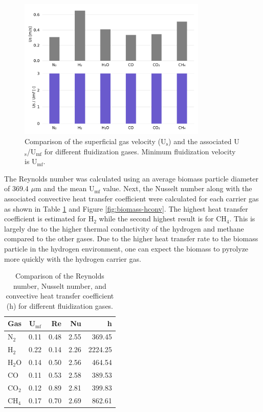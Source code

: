 \begin{figure}[H]
    \centering
    \includegraphics[width=0.8\textwidth]{figures/us-usumf-gases.pdf}
    \caption{Comparison of the superficial gas velocity (U$_\text{s}$) and the associated U$_\text{s}$/U$_\text{mf}$ for different fluidization gases. Minimum fluidization velocity is U$_\text{mf}$.}
    \label{fig:us-usumf-gases}
\end{figure}

The Reynolds number was calculated using an average biomass particle diameter of 369.4 $\mu$m and the mean U$_\text{mf}$ value. Next, the Nusselt number along with the associated convective heat transfer coefficient were calculated for each carrier gas as shown in Table \ref{tab:biomass-hconv} and Figure \ref{fig:biomass-hconv}. The highest heat transfer coefficient is estimated for H$_2$ while the second highest result is for CH$_4$. This is largely due to the higher thermal conductivity of the hydrogen and methane compared to the other gases. Due to the higher heat transfer rate to the biomass particle in the hydrogen environment, one can expect the biomass to pyrolyze more quickly with the hydrogen carrier gas.

\begin{table}[H]
    \centering
    \caption{Comparison of the Reynolds number, Nusselt number, and convective heat transfer coefficient (h) for different fluidization gases.}
    \label{tab:biomass-hconv}
    \begin{tabular}{lrrrr}
        \toprule
        Gas & U$_\text{mf}$ & Re & Nu & h \\
        \midrule
        N$_2$  & 0.11 & 0.48 & 2.55 & 369.45  \\
        H$_2$  & 0.22 & 0.14 & 2.26 & 2224.25 \\
        H$_2$O & 0.14 & 0.50 & 2.56 & 464.54  \\
        CO     & 0.11 & 0.53 & 2.58 & 389.53  \\
        CO$_2$ & 0.12 & 0.89 & 2.81 & 399.83  \\
        CH$_4$ & 0.17 & 0.70 & 2.69 & 862.61  \\
        \bottomrule
    \end{tabular}
\end{table}

